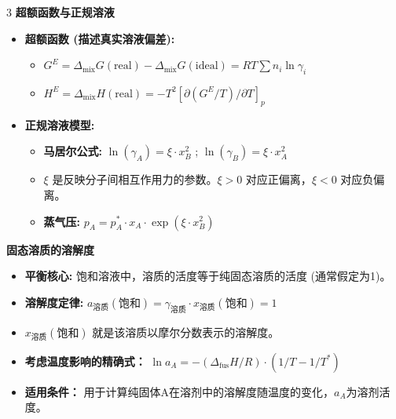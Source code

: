 \documentclass[a4paper,6pt]{article} %
\begin{document}
\begin{multicols}{3}
\textbf{超额函数与正规溶液}
\begin{itemize}
    \item \textbf{超额函数 (描述真实溶液偏差):}
    \begin{itemize}
        \item $G^E = \Delta_{\text{mix}}G(\text{real}) - \Delta_{\text{mix}}G(\text{ideal}) = RT \sum n_i \ln \gamma_i$
        \item $H^E = \Delta_{\text{mix}}H(\text{real}) = -T^2 [\partial(G^E/T)/\partial T]_p$
    \end{itemize}
    \item \textbf{正规溶液模型:}
    \begin{itemize}
        \item \textbf{马居尔公式:} $\ln(\gamma_A) = \xi \cdot x_B^2$ ; $\ln(\gamma_B) = \xi \cdot x_A^2$
        \item $\xi$ 是反映分子间相互作用力的参数。$\xi > 0$ 对应正偏离，$\xi < 0$ 对应负偏离。
        \item \textbf{蒸气压:} $p_A = p_A^* \cdot x_A \cdot \exp(\xi \cdot x_B^2)$
    \end{itemize}
\end{itemize}

\textbf{固态溶质的溶解度}
\begin{itemize}
    \item \textbf{平衡核心:} 饱和溶液中，溶质的活度等于纯固态溶质的活度 (通常假定为1)。
    \item \textbf{溶解度定律:} $a_{\text{溶质}}(\text{饱和}) = \gamma_{\text{溶质}} \cdot x_{\text{溶质}}(\text{饱和}) = 1$
    \item $x_{\text{溶质}}(\text{饱和})$ 就是该溶质以摩尔分数表示的溶解度。
    \item \textbf{考虑温度影响的精确式：} $\ln a_A = -(\Delta_{\text{fus}}H/R) \cdot (1/T - 1/T^*)$
    \item \textbf{适用条件：} 用于计算纯固体A在溶剂中的溶解度随温度的变化，$a_A$为溶剂活度。
\end{itemize}


\end{multicols}
\end{document}
